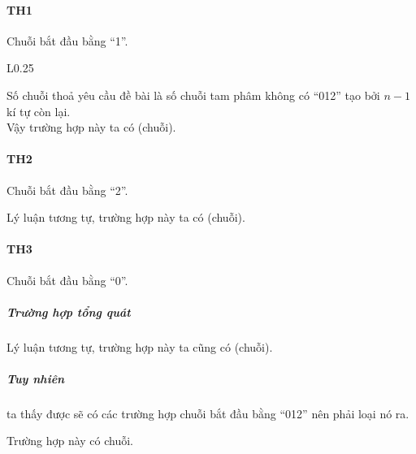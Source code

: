 \documentclass[main.tex]{subfiles}
\begin{document}
\paragraph{TH1} 
Chuỗi bắt đầu bằng ``1''.\\

\begin{wrapfigure}{L}{0.25\textwidth}
\end{wrapfigure}

Số chuỗi thoả yêu cầu đề bài là số chuỗi tam phâm không có ``012'' tạo bởi $n-1$ kí tự còn lại. \\
Vậy trường hợp này ta có  (chuỗi).\\

\paragraph{TH2} 
Chuỗi bắt đầu bằng ``2''.\\


Lý luận tương tự, trường hợp này ta có  (chuỗi).\\

\paragraph{TH3} 
Chuỗi bắt đầu bằng ``0''.\\
\subparagraph{Trường hợp tổng quát}

Lý luận tương tự, trường hợp này ta cũng có  (chuỗi).

\subparagraph{Tuy nhiên} ta thấy được sẽ có các trường hợp chuỗi bắt đầu bằng ``012'' nên phải loại nó ra.
Trường hợp này có  chuỗi.
\end{document}
